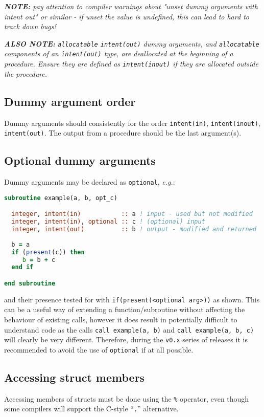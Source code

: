 \documentclass[11pt]{report}
\begin{document}
\textit{\textbf{NOTE:} pay attention to compiler warnings about "unset dummy arguments with intent out" or similar - if unset the value is undefined, this can lead to hard to track down bugs!}

\textit{\textbf{ALSO NOTE:} \texttt{allocatable} \texttt{intent(out)} dummy arguments, and \texttt{allocatable} components of an \texttt{intent(out)} type, are deallocated at the beginning of a procedure. Ensure they are defined as \texttt{intent(inout)} if they are allocated outside the procedure.}

\subsection{Dummy argument order}
Dummy arguments should consistently for the order \texttt{intent(in)}, \texttt{intent(inout)}, \texttt{intent(out)}. The output from a procedure should be the last argument(s).
\subsection{Optional dummy arguments}
\label{sec:opt-dummy-args}

Dummy arguments may be declared as \texttt{optional}, \textit{e.g.}:
\begin{lstlisting}[language=fortran, basicstyle=\fontsize{9}{10}\ttfamily\label{lst:intent_good}]
subroutine example(a, b, opt_c)

  integer, intent(in)           :: a ! input - used but not modified
  integer, intent(in), optional :: c ! (optional) input
  integer, intent(out)          :: b ! output - modified and returned
  
  b = a
  if (present(c)) then
     b = b + c
  end if

end subroutine
\end{lstlisting}
and their presence tested for with \texttt{if(present(<optional arg>))} as shown.
This can be a useful way of extending a function/subroutine without affecting the behaviour of
existing calls, however it does result in potentially difficult to understand code as the calls
\texttt{call example(a, b)} and \texttt{call example(a, b, c)} will clearly be very different.
Therefore, during the \texttt{v0.x} series of releases it is recommended to avoid the use of
\texttt{optional} if at all possible.

\subsection{Accessing struct members}
Accessing members of structs must be done using the \texttt{\%} operator, even though some compilers will support 
the C-style ``\texttt{.}'' alternative.
\end{document}
